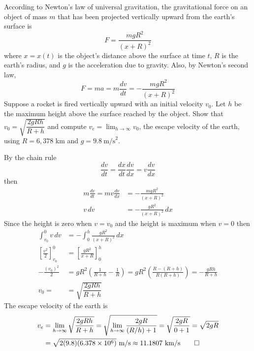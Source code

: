 \begin{problem}
    According to Newton's law of universal gravitation,
    the gravitational force on an object of mass \(m\) that has been
    projected vertically upward from the earth's surface is
    \[F=\frac{mgR^2}{(x+R)^2}\]
    where \(x=x(t)\) is the object's distance
    above the surface at time \(t\), \(R\) is the
    earth's radius, and \(g\) is the acceleration due to gravity.
    Also, by Newton's second law,
    \[F=ma=m\frac{dv}{dt}=-\frac{mgR^2}{(x+R)^2}\]
    Suppose a rocket is fired vertically upward with an initial velocity \(v_0\).
    Let \(h\) be the maximum height above the surface reached by the object.
    Show that \(v_0=\sqrt{\dfrac{2gRh}{R+h}}\) and compute
    \(v_e=\lim_{h\to\infty}v_0\), the escape velocity of the earth, using
    \(R=6,378\) km and \(g=9.8\ \text{m/s}^2\).
\end{problem}
\begin{solution}
    By the chain rule
    \[\frac{dv}{dt}=\frac{dx}{dt}\frac{dv}{dx}=v\frac{dv}{dx}\]
    then
    \begin{align*}
        m\frac{dv}{dt}=mv\frac{dv}{dx} &= -\frac{mgR^2}{(x+R)^2} \\
        v\,dv &= -\frac{gR^2}{(x+R)^2}\,dx
    \end{align*}
    Since the height is zero when \(v=v_0\) and the height is maximum when
    \(v=0\) then
    \begin{align*}
        \int_{v_0}^0 v\,dv &= -\int_0^h \frac{gR^2}{(x+R)^2}\,dx \\
        \left[\frac{v^2}{2}\right]_{v_0}^0
        &= \left[\frac{gR^2}{x+R}\right]_0^h \\
        -\frac{(v_0)^2}{2} &= gR^2\left(\frac{1}{R+h}-\frac{1}{R}\right)
        =gR^2\left(\frac{R-(R+h)}{R(R+h)}\right)=-\frac{gRh}{R+h} \\
        v_0= &= \sqrt{\dfrac{2gRh}{R+h}}
    \end{align*}
    The escape velocity of the earth is
    \begin{align*}
        v_e &= \lim_{h\to\infty}\sqrt{\dfrac{2gRh}{R+h}}
        =\sqrt{\lim_{h\to\infty}\frac{2gR}{(R/h)+1}}=\sqrt{\frac{2gR}{0+1}}
        =\sqrt{2gR} \\
        &=\sqrt{2(9.8)(6.378\times10^6)}\ \text{m/s}
        \approx 11.1807\ \text{km/s} \qedhere
    \end{align*}
\end{solution}